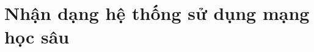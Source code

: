 \clearpage
{}

\setcounter{chapter}{2}
\chapter[NHẬN DẠNG HỆ THỐNG SỬ DỤNG MẠNG HỌC SÂU]{Nhận dạng hệ thống sử dụng mạng học sâu}
